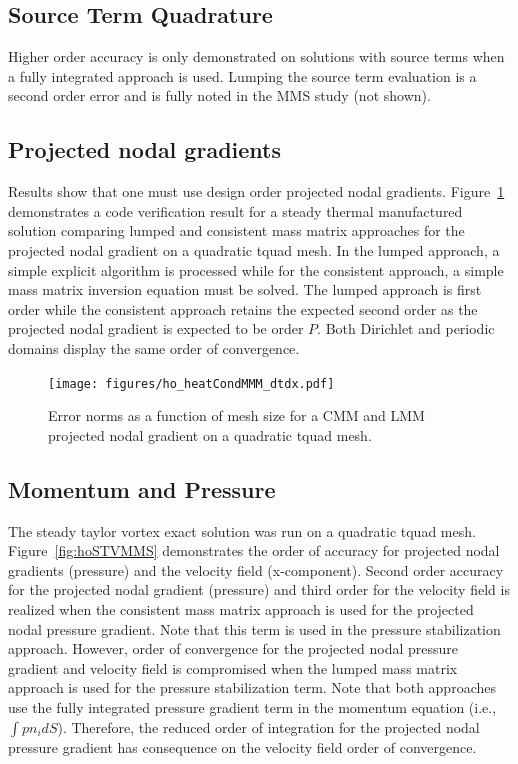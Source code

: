 \subsection{Source Term Quadrature}
Higher order accuracy is only demonstrated on solutions with source terms when a fully integrated
approach is used. Lumping the source term evaluation is a second order error and is fully noted in
the MMS study (not shown).

\subsection{Projected nodal gradients}
Results show that one must use design order projected nodal gradients. Figure~\ref{fig:pngTempMMS} demonstrates 
a code verification result for a steady thermal manufactured solution comparing lumped and consistent mass matrix approaches for the projected nodal gradient on a quadratic tquad mesh. In the lumped approach, a simple explicit algorithm is processed while for the consistent approach, a simple mass matrix inversion equation must be solved. The lumped approach is first order while the consistent approach retains the expected second order as the projected nodal gradient is expected to be order $P$. Both Dirichlet and periodic domains display the same order of convergence.

\begin{figure}
\centerline{\texttt{[image: figures/ho\_heatCondMMM\_dtdx.pdf]}}
\caption{Error norms as a function of mesh size for a CMM and LMM projected 
nodal gradient on a quadratic tquad mesh.}
\label{fig:pngTempMMS}
\end{figure}

\subsection{Momentum and Pressure}
The steady taylor vortex exact solution was run on a quadratic tquad mesh. Figure~\ref{fig:hoSTVMMS} demonstrates the order of accuracy for projected nodal gradients (pressure) and the velocity field (x-component). Second order accuracy for the projected nodal gradient (pressure) and third order for the velocity field is realized when the consistent mass matrix approach is used for the projected nodal pressure gradient. Note that this term is used in the pressure stabilization approach. However, order of convergence for the projected nodal pressure gradient and velocity field is compromised when the lumped mass matrix approach is used for the pressure stabilization term. Note that both approaches use the fully integrated pressure gradient term in the momentum equation (i.e., $\int p n_i dS$). Therefore, the reduced order of integration for the projected nodal pressure gradient has consequence on the velocity field order of convergence.
 
